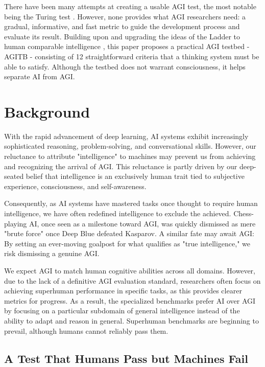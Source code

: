 \documentclass{article}
\begin{document}
There have been many attempts at creating a usable AGI test, the most notable being the Turing test \cite{Turing1950}. However, none provides what AGI researchers need: a gradual, informative, and fast metric to guide the development process and evaluate its result. Building upon and upgrading the ideas of the Ladder to human comparable intelligence \cite{Sprogar2018}, this paper proposes a practical AGI testbed - AGITB - consisting of 12 straightforward criteria that a thinking system must be able to satisfy. Although the testbed does not warrant consciousness, it helps separate AI from AGI.


\section{Background}

With the rapid advancement of deep learning, AI systems exhibit increasingly sophisticated reasoning, problem-solving, and conversational skills. However, our reluctance to attribute "intelligence" to machines may prevent us from achieving and recognizing the arrival of AGI. This reluctance is partly driven by our deep-seated belief that intelligence is an exclusively human trait tied to subjective experience, consciousness, and self-awareness. 

Consequently, as AI systems have mastered tasks once thought to require human intelligence, we have often redefined intelligence to exclude the achieved. Chess-playing AI, once seen as a milestone toward AGI, was quickly dismissed as mere "brute force" once Deep Blue defeated Kasparov. A similar fate may await AGI: By setting an ever-moving goalpost for what qualifies as "true intelligence," we risk dismissing a genuine AGI. 

We expect AGI to match human cognitive abilities across all domains. However, due to the lack of a definitive AGI evaluation standard, researchers often focus on achieving superhuman performance in specific tasks, as this provides clearer metrics for progress. As a result, the specialized benchmarks prefer AI over AGI by focusing on a particular subdomain of general intelligence instead of the ability to adapt and reason in general. Superhuman benchmarks are beginning to prevail, although humans cannot reliably pass them.

\subsection{A Test That Humans Pass but Machines Fail}
\end{document}

